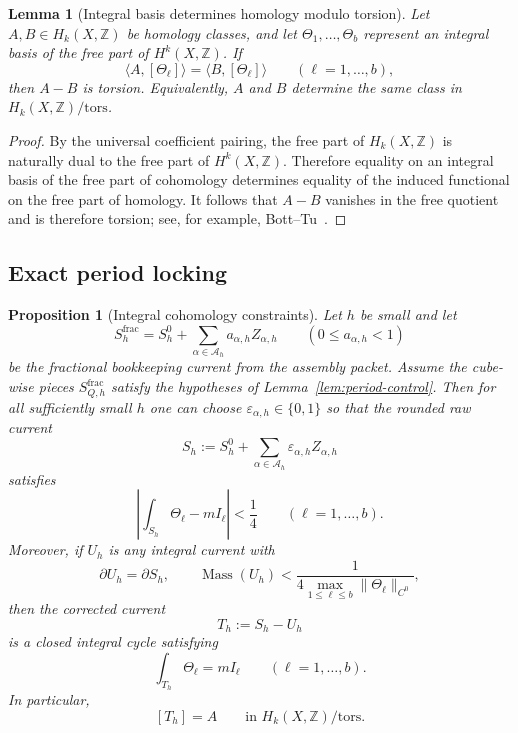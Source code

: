 \documentclass[11pt]{article}
\numberwithin{equation}{section}
\theoremstyle{plain}
\newtheorem{proposition}[theorem]{Proposition}
\newtheorem{lemma}[theorem]{Lemma}
\theoremstyle{definition}
\theoremstyle{remark}
\DeclareMathOperator{\Mass}{Mass}
\newcommand{\Z}{\mathbb{Z}}
\newcommand{\calA}{\mathcal{A}}
\begin{document}
\begin{lemma}[Integral basis determines homology modulo torsion]\label{lem:free-basis-determines-class}
Let $A,B\in H_k(X,\Z)$ be homology classes, and let
$\Theta_1,\dots,\Theta_b$ represent an integral basis of the free part of
$H^k(X,\Z)$.  If
\[
\langle A,[\Theta_\ell]\rangle=\langle B,[\Theta_\ell]\rangle
\qquad (\ell=1,\dots,b),
\]
then $A-B$ is torsion.  Equivalently, $A$ and $B$ determine the same class in
$H_k(X,\Z)/\mathrm{tors}$.
\end{lemma}

\begin{proof}
By the universal coefficient pairing, the free part of $H_k(X,\Z)$ is naturally
dual to the free part of $H^k(X,\Z)$.  Therefore equality on an integral basis of
the free part of cohomology determines equality of the induced functional on the
free part of homology.  It follows that $A-B$ vanishes in the free quotient and is
therefore torsion; see, for example, Bott--Tu~\cite{BottTu82}.
\end{proof}

\subsection{Exact period locking}

\begin{proposition}[Integral cohomology constraints]\label{prop:cohomology}
Let $h$ be small and let
\[
S_h^{\mathrm{frac}}=S_h^0+\sum_{\alpha\in\calA_h} a_{\alpha,h} Z_{\alpha,h}
\qquad (0\le a_{\alpha,h}<1)
\]
be the fractional bookkeeping current from the assembly packet.  Assume the cube-wise pieces $S_{Q,h}^{\mathrm{frac}}$ satisfy the hypotheses of Lemma~\ref{lem:period-control}.  Then for all sufficiently small $h$ one can choose $\varepsilon_{\alpha,h}\in\{0,1\}$ so that the rounded raw current
\[
S_h:=S_h^0+\sum_{\alpha\in\calA_h}\varepsilon_{\alpha,h} Z_{\alpha,h}
\]
satisfies
\[
\left|\int_{S_h}\Theta_\ell - mI_\ell\right|<\frac14
\qquad (\ell=1,\dots,b).
\]
Moreover, if $U_h$ is any integral current with
\[
\partial U_h=\partial S_h,
\qquad
\Mass(U_h)<\frac{1}{4\max_{1\le \ell\le b}\|\Theta_\ell\|_{C^0}},
\]
then the corrected current
\[
T_h:=S_h-U_h
\]
is a closed integral cycle satisfying
\[
\int_{T_h}\Theta_\ell = mI_\ell
\qquad (\ell=1,\dots,b).
\]
In particular,
\[
[T_h]=A
\qquad\text{in } H_k(X,\Z)/\mathrm{tors}.
\]
\end{proposition}
\end{document}
